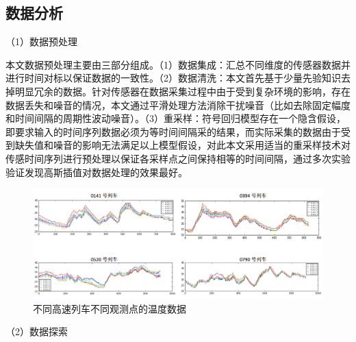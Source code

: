 \subsection{数据分析}

（1）数据预处理

本文数据预处理主要由三部分组成。（1）数据集成：汇总不同维度的传感器数据并进行时间对标以保证数据的一致性。（2）数据清洗：本文首先基于少量先验知识去掉明显冗余的数据。针对传感器在数据采集过程中由于受到复杂环境的影响，存在数据丢失和噪音的情况，本文通过平滑处理方法消除干扰噪音（比如去除固定幅度和时间间隔的周期性波动噪音）。（3）重采样：符号回归模型存在一个隐含假设，即要求输入的时间序列数据必须为等时间间隔采的结果，而实际采集的数据由于受到缺失值和噪音的影响无法满足以上模型假设，对此本文采用适当的重采样技术对传感时间序列进行预处理以保证各采样点之间保持相等的时间间隔\cite{good2006resampling}，通过多次实验验证发现高斯插值对数据处理的效果最好。
\begin{figure}[H]
\centering
\includegraphics[scale=0.5]{figures/sr-data-temp.png}
\caption{不同高速列车不同观测点的温度数据}
\label{fig:sr-data-temp-corr}
\end{figure}  
（2）数据探索

